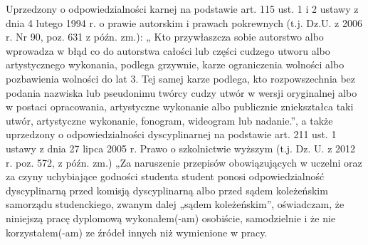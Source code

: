 \newpage
\thispagestyle{empty}
\mbox{}

\noindent
Uprzedzony o odpowiedzialności karnej na podstawie art. 115 ust. 1 i 2
ustawy z dnia 4 lutego 1994 r. o prawie autorskim i prawach pokrewnych
(t.j. Dz.U. z 2006 r. Nr 90, poz. 631 z późn. zm.): „ Kto przywłaszcza
sobie autorstwo albo wprowadza w błąd co do autorstwa całości lub części
cudzego utworu albo artystycznego wykonania, podlega grzywnie, karze
ograniczenia wolności albo pozbawienia wolności do lat 3. Tej samej
karze podlega, kto rozpowszechnia bez podania nazwiska lub pseudonimu
twórcy cudzy utwór w wersji oryginalnej albo w postaci opracowania,
artystyczne wykonanie albo publicznie zniekształca taki utwór,
artystyczne wykonanie, fonogram, wideogram lub nadanie.”, a także
uprzedzony o odpowiedzialności dyscyplinarnej na podstawie art. 211 ust. 1
ustawy z dnia 27 lipca 2005 r. Prawo o szkolnictwie wyższym (t.j. Dz.
U. z 2012 r. poz. 572, z późn. zm.) „Za naruszenie przepisów
obowiązujących w uczelni oraz za czyny uchybiające godności studenta
student ponosi odpowiedzialność dyscyplinarną przed komisją
dyscyplinarną albo przed sądem koleżeńskim samorządu studenckiego,
zwanym dalej „sądem koleżeńskim”, oświadczam, że niniejszą pracę
dyplomową wykonałem(-am) osobiście, samodzielnie i że nie
korzystałem(-am) ze źródeł innych niż wymienione w pracy.